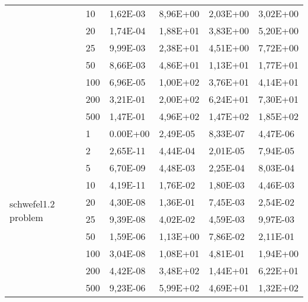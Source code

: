 \begin{longtable}[c]{|p{3.5cm}|l|l|l|l|l|}
                                        & 10        & 1,62E-03   & 8,96E+00   & 2,03E+00   & 3,02E+00  \\ \cline{2-6} 
                                        & 20        & 1,74E-04   & 1,88E+01   & 3,83E+00   & 5,20E+00  \\ \cline{2-6} 
                                        & 25        & 9,99E-03   & 2,38E+01   & 4,51E+00   & 7,72E+00  \\ \cline{2-6} 
                                        & 50        & 8,66E-03   & 4,86E+01   & 1,13E+01   & 1,77E+01  \\ \cline{2-6} 
                                        & 100       & 6,96E-05   & 1,00E+02   & 3,76E+01   & 4,14E+01  \\ \cline{2-6} 
                                        & 200       & 3,21E-01   & 2,00E+02   & 6,24E+01   & 7,30E+01  \\ \cline{2-6} 
                                        & 500       & 1,47E-01   & 4,96E+02   & 1,47E+02   & 1,85E+02  \\ \hline
\multirow[t]{10}{*}{schwefel1.2 problem}   & 1         & 0.00E+00   & 2,49E-05   & 8,33E-07   & 4,47E-06  \\ \cline{2-6} 
                                        & 2         & 2,65E-11   & 4,44E-04   & 2,01E-05   & 7,94E-05  \\ \cline{2-6} 
                                        & 5         & 6,70E-09   & 4,48E-03   & 2,25E-04   & 8,03E-04  \\ \cline{2-6} 
                                        & 10        & 4,19E-11   & 1,76E-02   & 1,80E-03   & 4,46E-03  \\ \cline{2-6} 
                                        & 20        & 4,30E-08   & 1,36E-01   & 7,45E-03   & 2,54E-02  \\ \cline{2-6} 
                                        & 25        & 9,39E-08   & 4,02E-02   & 4,59E-03   & 9,97E-03  \\ \cline{2-6} 
                                        & 50        & 1,59E-06   & 1,13E+00   & 7,86E-02   & 2,11E-01  \\ \cline{2-6} 
                                        & 100       & 3,04E-08   & 1,08E+01   & 4,81E-01   & 1,94E+00  \\ \cline{2-6} 
                                        & 200       & 4,42E-08   & 3,48E+02   & 1,44E+01   & 6,22E+01  \\ \cline{2-6} 
                                        & 500       & 9,23E-06   & 5,99E+02   & 4,69E+01   & 1,32E+02  \\ \hline

\end{longtable}
